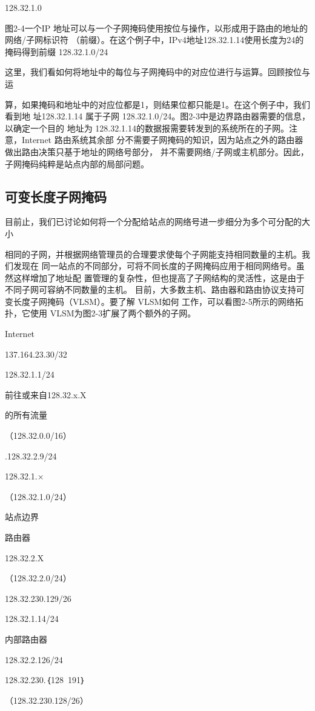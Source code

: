 128.32.1.0

图2-4一个IP 地址可以与一个子网掩码使用按位与操作，以形成用于路由的地址的网络/子网标识符
（前缀）。在这个例子中，IPv4地址128.32.1.14使用长度为24的掩码得到前缀 128.32.1.0/24

这里，我们看如何将地址中的每位与子网掩码中的对应位进行与运算。回顾按位与运

算，如果掩码和地址中的对应位都是1，则结果位都只能是1。在这个例子中，我们看到地
址128.32.1.14 属于子网 128.32.1.0/24。图2-3中是边界路由器需要的信息，以确定一个目的
地址为 128.32.1.14的数据报需要转发到的系统所在的子网。注意，Internet 路由系统其余部
分不需要子网掩码的知识，因为站点之外的路由器做出路由决策只基于地址的网络号部分，
并不需要网络/子网或主机部分。因此，子网掩码纯粹是站点内部的局部问题。

\subsection{可变长度子网掩码}
目前止，我们已讨论如何将一个分配给站点的网络号进一步细分为多个可分配的大小

相同的子网，并根据网络管理员的合理要求使每个子网能支持相同数量的主机。我们发现在
同一站点的不同部分，可将不同长度的子网掩码应用于相同网络号。虽然这样增加了地址配
置管理的复杂性，但也提高了子网结构的灵活性，这是由于不同子网可容纳不同数量的主机。
目前，大多数主机、路由器和路由协议支持可变长度子网掩码（VLSM）。要了解 VLSM如何
工作，可以看图2-5所示的网络拓扑，它使用 VLSM为图2-3扩展了两个额外的子网。

Internet

137.164.23.30/32

128.32.1.1/24

前往或来自128.32.x.X

的所有流量

（128.32.0.0/16）

.128.32.2.9/24

128.32.1.×

（128.32.1.0/24）

站点边界

路由器

128.32.2.X

（128.32.2.0/24）

128.32.230.129/26

128.32.1.14/24

内部路由器

128.32.2.126/24

128.32.230.｛128~191｝

（128.32.230.128/26）

